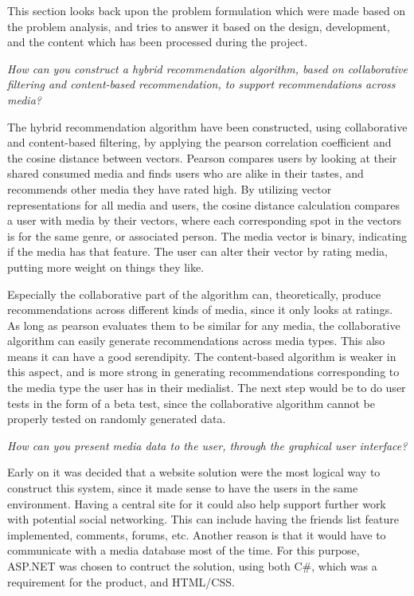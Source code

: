 This section looks back upon the problem formulation which were made based on the problem analysis, and tries to answer it based on the design, development, and the content which has been processed during the project.

\textit{How can you construct a hybrid recommendation algorithm, based on collaborative filtering and content-based recommendation, to support recommendations across media?}

The hybrid recommendation algorithm have been constructed, using collaborative and content-based filtering, by applying the pearson correlation coefficient and the cosine distance between vectors. Pearson compares users by looking at their shared consumed media and finds users who are alike in their tastes, and recommends other media they have rated high. By utilizing vector representations for all media and users, the cosine distance calculation compares a user with media by their vectors, where each corresponding spot in the vectors is for the same genre, or associated person. The media vector is binary, indicating if the media has that feature. The user can alter their vector by rating media, putting more weight on things they like.

Especially the collaborative part of the algorithm can, theoretically, produce recommendations across different kinds of media, since it only looks at ratings. As long as pearson evaluates them to be similar for any media, the collaborative algorithm can easily generate recommendations across media types. This also means it can have a good serendipity. The content-based algorithm is weaker in this aspect, and is more strong in generating recommendations corresponding to the media type the user has in their medialist. The next step would be to do user tests in the form of a beta test, since the collaborative algorithm cannot be properly tested on randomly generated data.

\textit{How can you present media data to the user, through the graphical user interface?}

Early on it was decided that a website solution were the most logical way to construct this system, since it made sense to have the users in the same environment. Having a central site for it could also help support further work with potential social networking. This can include having the friends list feature implemented, comments, forums, etc. Another reason is that it would have to communicate with a media database most of the time. For this purpose, ASP.NET was chosen to contruct the solution, using both C\#, which was a requirement for the product, and HTML/CSS. 

